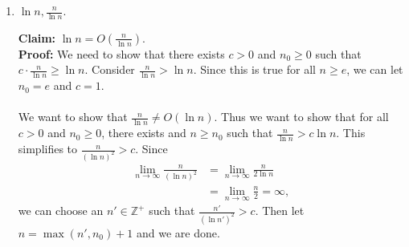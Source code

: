 \documentclass{article}
\begin{document}
\begin{enumerate}
	\item $\displaystyle \ln n , \frac{n}{\ln n}$. \\
	      \begin{comment}
				{\bf Claim:} $\displaystyle \ln n \leq \frac{n}{\ln n}$ for all $n \geq e^4$ and thus $\displaystyle \ln n = O(\frac{n}{\ln n})$. It follows that 
				$\displaystyle \frac{n}{\ln n} = \Omega(\ln n)$. \\
				{\bf Proof:} For all $n \geq e^4$, we have that:
					\begin{align*}
						\ln n & \leq \frac{1}{e^2} n \quad \Rightarrow \\
						e^2 \ln n & \leq n \quad \Rightarrow \\
						e^{2 (\ln \ln n)} & \leq e^{\ln n} \quad \Rightarrow \\
						2 (\ln \ln n) & \leq \ln n \quad \Rightarrow \\
						\ln \ln n & \leq \ln n - \ln \ln n \Rightarrow \\
						\ln n & \leq \frac{n}{\ln n}.
					\end{align*}
				Thus for all $n \geq n_0 = e^4$, we have that $\ln n \leq \frac{n}{\ln n}$. Applying Theorem 1, we have the second part and we are done. Since 
				we have the inequality, they are not $\Theta$ of each other. \\ \\
				\end{comment}
				{\bf Claim:} $\ln n = O(\frac{n}{\ln n})$. \\ 
				{\bf Proof:} We need to show that there exists $c > 0$ and $n_0 \geq 0$ such that $c \cdot \frac{n}{\ln n} \geq \ln n$. Consider 
				$\frac{n}{\ln n} > \ln n$. Since this is true for all $n \geq e$, we can let $n_0 = e$ and $c = 1$.\\ \\ 
				We want to show that $\frac{n}{\ln n} \neq O(\ln n)$. Thus we want to show that for all $c > 0$ and $n_0 \geq 0$, there exists and $n \geq n_0$ 
				such that $\frac{n}{\ln n} > c \ln n$. This simplifies to $\frac{n}{(\ln n)^2} > c$. Since
					\begin{align*}
						\lim_{n \to \infty} \frac{n}{(\ln n)^2} & = \lim_{n \to \infty} \frac{n}{2 \ln n} \\
																										& = \lim_{n \to \infty} \frac{n}{2} = \infty,																					
					\end{align*}
				we can choose an $n' \in \mathbb{Z}^+$ such that $\frac{n'}{(\ln n')^2} > c$. Then let $n = \max(n', n_0) + 1$ and we are done.
				
				
						
\end{enumerate}
\end{document}
